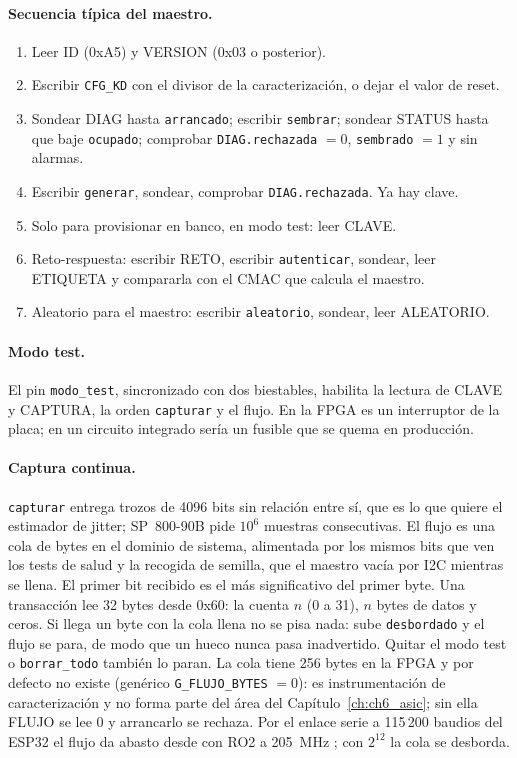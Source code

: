 \paragraph{Secuencia típica del maestro.}
\begin{enumerate}
\item Leer ID (0xA5) y VERSION (0x03 o posterior).
\item Escribir \texttt{CFG\_KD} con el divisor de la caracterización, o
  dejar el valor de reset.
\item Sondear DIAG hasta \texttt{arrancado}; escribir \texttt{sembrar};
  sondear STATUS hasta que baje \texttt{ocupado}; comprobar
  \texttt{DIAG.rechazada} $= 0$, \texttt{sembrado} $= 1$ y sin alarmas.
\item Escribir \texttt{generar}, sondear, comprobar \texttt{DIAG.rechazada}.
  Ya hay clave.
\item Solo para provisionar en banco, en modo test: leer CLAVE.
\item Reto-respuesta: escribir RETO, escribir \texttt{autenticar}, sondear,
  leer ETIQUETA y compararla con el \ac{CMAC} que calcula el maestro.
\item Aleatorio para el maestro: escribir \texttt{aleatorio}, sondear, leer
  ALEATORIO.
\end{enumerate}

\paragraph{Modo test.} El pin \texttt{modo\_test}, sincronizado con dos
biestables, habilita la lectura de CLAVE y CAPTURA, la orden
\texttt{capturar} y el flujo. En la \ac{FPGA} es un interruptor de la
placa; en un circuito integrado sería un fusible que se quema en
producción.

\paragraph{Captura continua.} \texttt{capturar} entrega trozos de 4096
bits sin relación entre sí, que es lo que quiere el estimador de jitter;
SP~800-90B pide $10^6$ muestras consecutivas. El flujo es una cola de
bytes en el dominio de sistema, alimentada por los mismos bits que ven
los tests de salud y la recogida de semilla, que el maestro vacía por
\ac{I2C} mientras se llena. El primer bit recibido es el más
significativo del primer byte. Una transacción lee 32 bytes desde 0x60:
la cuenta $n$ (0 a 31), $n$ bytes de datos y ceros. Si llega un byte con
la cola llena no se pisa nada: sube \texttt{desbordado} y el flujo se
para, de modo que un hueco nunca pasa inadvertido. Quitar el modo test o
\texttt{borrar\_todo} también lo paran. La cola tiene 256 bytes en la
\ac{FPGA} y por defecto no existe (genérico \texttt{G\_FLUJO\_BYTES}
$= 0$): es instrumentación de caracterización y no forma parte del área
del Capítulo~\ref{ch:ch6_asic}; sin ella FLUJO se lee 0 y arrancarlo se
rechaza. Por el enlace serie a 115\,200 baudios del ESP32 el flujo da
abasto desde  con RO2 a 205~MHz \meas{}; con $2^{12}$ la cola se
desborda.

